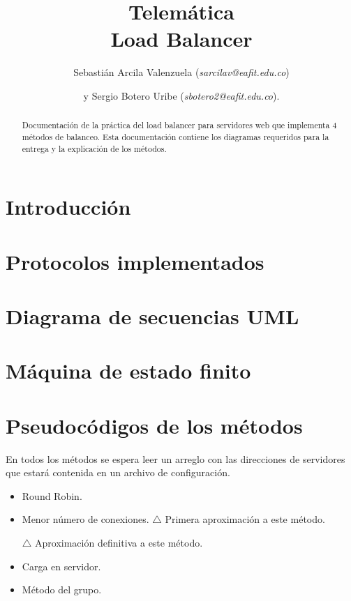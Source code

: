 \documentclass[
	final,
	notitlepage,
	narroweqnarray,
	inline,
	twoside,
	]{ieee}
\begin{document}
\title[Load Balancer]{
       Telemática\\ Load Balancer}


\author[]{Sebastián Arcila Valenzuela (\textit{sarcilav@eafit.edu.co})
\and{}y Sergio Botero Uribe (\textit{sbotero2@eafit.edu.co}).
}

\titletext{, \today}
\maketitle               

\begin{abstract} 
Documentación de la práctica del load balancer para servidores web que implementa 4 métodos de balanceo. Esta documentación
contiene los diagramas requeridos para la entrega y la explicación de los métodos.
\end{abstract}

\section{Introducción}
	

\section{Protocolos implementados}
	

\section{Diagrama de secuencias UML}
	

\section{Máquina de estado finito}
	
	
\section{Pseudocódigos de los métodos}

	En todos los métodos se espera leer un arreglo con las direcciones de servidores que estará contenida en un archivo de configuración.
	\begin{itemize}
	\item Round Robin.
		
	\item Menor número de conexiones.
		$\triangle$ Primera aproximación a este método.
		
		$\triangle$ Aproximación definitiva a este método.
		
	\item Carga en servidor.
		
	\item Método del grupo.
		
	\end{itemize}
	
\end{document}
